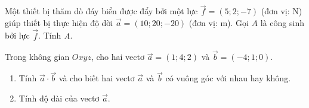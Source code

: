 \begin{bt}%
	Một thiết bị thăm dò đáy biển được đẩy bởi một lực $\overrightarrow{f}=(5; 2;-7)$ (đơn vị: N) giúp thiết bị thực hiện độ dời $\overrightarrow{a}=(10; 20;-20)$ (đơn vị: m). Gọi $A$ là công sinh bởi lực $\overrightarrow{f}$. Tính $A$.
\end{bt}

\begin{bt}%

	Trong không gian $Oxyz$, cho hai vectơ $\overrightarrow{a}=(1;4;2)$ và $\overrightarrow{b}=(-4;1;0)$.
	\begin{enumerate}
		\item Tính $\overrightarrow{a} \cdot \overrightarrow{b}$ và cho biết hai vectơ $\overrightarrow{a}$ và $\overrightarrow{b}$ có vuông góc với nhau hay không.
		\item Tính độ dài của vectơ $\overrightarrow{a}$.
	\end{enumerate}
\end{bt}

